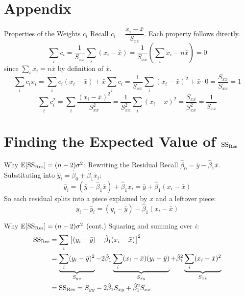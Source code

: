 \appendix

\section*{Appendix}


\begin{frame}{Properties of the Weights $c_i$}
	Recall $c_i = \dfrac{x_i - \bar x}{S_{xx}}$. Each property follows directly.
	\pause
	\[
		\sum_i c_i = \frac{1}{S_{xx}}\sum_i(x_i - \bar x) = \frac{1}{S_{xx}}\left(\sum_i x_i - n\bar x\right) = 0
	\]
	since $\sum_i x_i = n\bar x$ by definition of $\bar x$.
	\pause
	\[
		\sum_i c_i x_i = \sum_i c_i(x_i - \bar x) + \bar x\sum_i c_i = \frac{1}{S_{xx}}\sum_i(x_i-\bar x)^2 + \bar x\cdot 0 = \frac{S_{xx}}{S_{xx}} = 1
	\]
	\pause
	\[
		\sum_i c_i^2 = \sum_i\frac{(x_i-\bar x)^2}{S_{xx}^2} = \frac{1}{S_{xx}^2}\sum_i(x_i-\bar x)^2 = \frac{S_{xx}}{S_{xx}^2} = \frac{1}{S_{xx}}
	\]
\end{frame}


\section*{Finding the Expected Value of \texorpdfstring{\(\mathrm{SS}_{\mathrm{Res}}\)}{SSE}}


\begin{frame}{Why $\operatorname{E}[\mathrm{SS}_{\mathrm{Res}}] = (n-2)\sigma^2$: Rewriting the Residual}
	Recall $\hat\beta_0 = \bar y - \hat\beta_1 \bar x$. Substituting into $\hat y_i = \hat\beta_0 + \hat\beta_1 x_i$:
	\[
		\hat y_i = (\bar y - \hat\beta_1\bar x) + \hat\beta_1 x_i = \bar y + \hat\beta_1(x_i - \bar x)
	\]
	\pause
	So each residual splits into a piece explained by $x$ and a leftover piece:
	\[
		y_i - \hat y_i = (y_i - \bar y) - \hat\beta_1(x_i - \bar x)
	\]
\end{frame}
 

\begin{frame}{Why $\operatorname{E}[\mathrm{SS}_{\mathrm{Res}}] = (n-2)\sigma^2$ (cont.)}
	Squaring and summing over $i$:
	\begin{align*}
		\mathrm{SS}_{\mathrm{Res}} &= \sum_i\big[(y_i-\bar y) - \hat\beta_1(x_i-\bar x)\big]^2 \\
		 &= \underbrace{\sum_i(y_i-\bar y)^2}_{S_{yy}} - 2\hat\beta_1\underbrace{\sum_i(x_i-\bar x)(y_i-\bar y)}_{S_{xy}} + \hat\beta_1^2\underbrace{\sum_i(x_i-\bar x)^2}_{S_{xx}} \\
		 &= \mathrm{SS}_{\mathrm{Res}} = S_{yy} - 2\hat\beta_1 S_{xy} + \hat\beta_1^2 S_{xx}
	\end{align*}
\end{frame}


